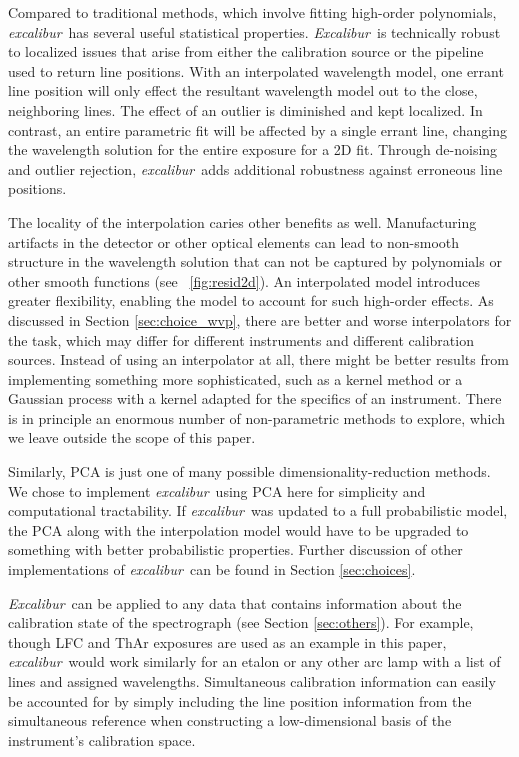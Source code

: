 \documentclass[twocolumn,table,xcolor,trackchanges]{aastex63}
\newcommand{\project}[1]{\textsl{#1}}
\newcommand{\name}{\project{excalibur}}
\newcommand{\Name}{\project{Excalibur}}
\begin{document}
Compared to traditional methods, which involve fitting high-order polynomials, \name\ has several useful statistical properties.  \Name\ is technically robust to localized issues that arise from either the calibration source or the pipeline used to return line positions.  With an interpolated wavelength model, one errant line position will only effect the resultant wavelength model out to the close, neighboring lines.  The effect of an outlier is diminished and kept localized.  In contrast, an entire parametric fit will be affected by a single errant line, changing the wavelength solution for the entire exposure for a 2D fit.  Through de-noising and outlier rejection, \name\ adds additional robustness against erroneous line positions.

The locality of the interpolation caries other benefits as well.  Manufacturing artifacts in the detector or other optical elements can lead to non-smooth structure in the wavelength solution that can not be captured by polynomials or other smooth functions (see \figurename~\ref{fig:resid2d}).  An interpolated model introduces greater flexibility, enabling the model to account for such high-order effects.  As discussed in Section \ref{sec:choice_wvp}, there are better and worse interpolators for the task, which may differ for different instruments and different calibration sources.  Instead of using an interpolator at all, there might be better results from implementing something more sophisticated, such as a kernel method or a Gaussian process with a kernel adapted for the specifics of an instrument.  There is in principle an enormous number of non-parametric methods to explore, which we leave outside the scope of this paper.

Similarly, PCA is just one of many possible dimensionality-reduction methods.  We chose to implement \name\ using PCA here for simplicity and computational tractability.  If \name\ was updated to a full probabilistic model, the PCA along with the interpolation model would have to be upgraded to something with better probabilistic properties.    Further discussion of other implementations of \name\ can be found in Section \ref{sec:choices}.

\Name\ can be applied to any data that contains information about the calibration state of the spectrograph (see Section \ref{sec:others}).  For example, though LFC and ThAr exposures are used as an example in this paper, \name\ would work similarly for an etalon or any other arc lamp with a list of lines and assigned wavelengths.  Simultaneous calibration information can easily be accounted for by simply including the line position information from the simultaneous reference when constructing a low-dimensional basis of the instrument's calibration space.
\end{document}
